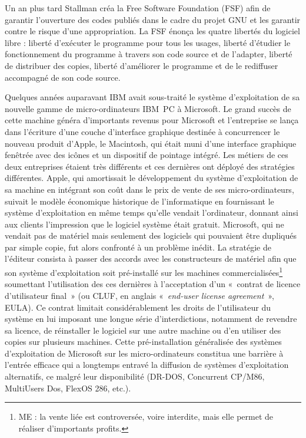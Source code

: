 \documentclass{FramateX}
\begin{document}
\begin{refsection}
Un an plus tard Stallman créa la Free Software Foundation (FSF) afin de
garantir l'ouverture des codes publiés dans le cadre du projet GNU et
les garantir contre le risque d'une appropriation. La FSF énonça les
quatre libertés du logiciel libre : liberté d'exécuter le programme
pour tous les usages, liberté d'étudier le fonctionnement du programme
à travers son code source et de l'adapter, liberté de distribuer des
copies, liberté d'améliorer le programme et de le rediffuser accompagné
de son code source.

Quelques années auparavant IBM avait sous-traité le système
d'exploitation de sa nouvelle gamme de micro-ordinateurs IBM~PC à
Microsoft. Le grand succès de cette machine généra d'importants revenus
pour Microsoft et l'entreprise se lança dans l'écriture d'une couche
d'interface graphique destinée à concurrencer le nouveau produit
d'Apple, le Macintosh, qui était muni d'une interface graphique
fenêtrée avec des icônes et un dispositif de pointage intégré. Les
métiers de ces deux entreprises étaient très différents et ces
dernières ont déployé des stratégies différentes. Apple, qui
amortissait le développement du système d'exploitation de sa machine en
intégrant son coût dans le prix de vente de ses micro-ordinateurs,
suivait le modèle économique historique de l'informatique en
fournissant le système d'exploitation en même temps qu'elle vendait
l'ordinateur, donnant ainsi aux clients l'impression que le logiciel
système était gratuit. Microsoft, qui ne vendait pas de matériel mais
seulement des logiciels qui pouvaient être dupliqués par simple copie,
fut alors confronté à un problème inédit. La stratégie de l'éditeur
consista à passer des accords avec les constructeurs de matériel afin
que son système d'exploitation soit pré-installé sur
les machines commercialisées\footnote{ME : la vente liée est
controversée, voire interdite, mais elle permet de réaliser
d'importants profits.} soumettant l'utilisation des
ces dernières à l'acceptation d'un «~contrat de licence d'utilisateur
final~» (ou CLUF, en anglais «~\textit{end-user license agreement}~»,
EULA). Ce contrat limitait considérablement les droits de l'utilisateur
du système en lui imposant une longue série d'interdictions, notamment
de revendre sa licence, de réinstaller le logiciel sur une autre
machine ou d'en utiliser des copies sur plusieurs machines. Cette
pré-installation généralisée des systèmes d'exploitation de Microsoft
sur les micro-ordinateurs constitua une barrière à l'entrée efficace
qui a longtemps entravé la diffusion de systèmes d'exploitation
alternatifs, ce malgré leur disponibilité (DR-DOS, Concurrent CP/M86,
MultiUsers Dos, FlexOS 286, etc.).


\end{refsection}
\end{document}
